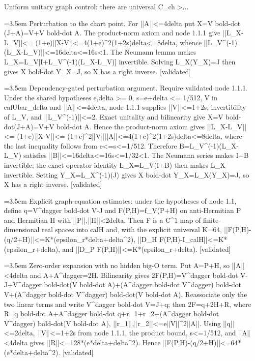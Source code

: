\documentclass{article}
\newcommand{\step}[1]{\par\noindent\hangindent=3.5em\hangafter=1%
  \makebox[3.5em][l]{\textbf{#1.}}}
\newcommand{\steptag}[1]{\hfill{\small\textsf{[#1]}}}
\begin{document}
\begin{proofbox}{Uniform unitary graph control: there are universal C\_ch >...}
\step{1.1.2} Perturbation to the chart point. For ||A||<=4delta put X=V bold-dot (J+A)=V+V bold-dot A. The product-norm axiom and node 1.1.1 give ||L\_X-L\_V||<= (1+e)||X-V||<=4(1+e)\textasciicircum{}2(1+2s)delta<=8delta, whence ||L\_V\textasciicircum{}(-1)(L\_X-L\_V)||<=16delta<=16s<1. The Neumann lemma makes L\_X=L\_V[I+L\_V\textasciicircum{}(-1)(L\_X-L\_V)] invertible. Solving L\_X(Y\_X)=J then gives X bold-dot Y\_X=J, so X has a right inverse. \steptag{validated} \\[6pt]
\step{1.1.2.1} Dependency-gated perturbation argument. Require validated node 1.1.1. Under the shared hypotheses e,delta >= 0, s=e+delta <= 1/512, V in calUbar\_delta and ||A||<=4delta, node 1.1.1 supplies ||V||<=1+2s, invertibility of L\_V, and ||L\_V\textasciicircum{}(-1)||<=2. Exact unitality and bilinearity give X=V bold-dot(J+A)=V+V bold-dot A. Hence the product-norm axiom gives ||L\_X-L\_V||<= (1+e)||X-V||<= (1+e)\textasciicircum{}2||V||||A||<=4(1+e)\textasciicircum{}2(1+2s)delta<=8delta, where the last inequality follows from e<=s<=1/512. Therefore B=L\_V\textasciicircum{}(-1)(L\_X-L\_V) satisfies ||B||<=16delta<=16s<=1/32<1. The Neumann series makes I+B invertible; the exact operator identity L\_X=L\_V(I+B) then makes L\_X invertible. Setting Y\_X=L\_X\textasciicircum{}(-1)(J) gives X bold-dot Y\_X=L\_X(Y\_X)=J, so X has a right inverse. \steptag{validated} \\[4pt]
\step{1.2} Explicit graph-equation estimates: under the hypotheses of node 1.1, define q=V\textasciicircum{}dagger bold-dot V-J and F(P,H)=f\_V(P+H) on anti-Hermitian P and Hermitian H with ||P||,||H||<2delta. Then F is a C\textasciicircum{}1 map of finite-dimensional real spaces into calH and, with the explicit universal K=64, ||F(P,H)-(q/2+H)||<=K*(epsilon\_r*delta+delta\textasciicircum{}2), ||D\_H F(P,H)-I\_calH||<=K*(epsilon\_r+delta), and ||D\_P F(P,H)||<=K*(epsilon\_r+delta). \steptag{validated} \\[6pt]
\step{1.2.1} Zero-order expansion with no hidden big-O term. Put A=P+H, so ||A||<4delta and A+A\textasciicircum{}dagger=2H. Bilinearity gives 2F(P,H)=V\textasciicircum{}dagger bold-dot V-J+V\textasciicircum{}dagger bold-dot(V bold-dot A)+(A\textasciicircum{}dagger bold-dot V\textasciicircum{}dagger) bold-dot V+(A\textasciicircum{}dagger bold-dot V\textasciicircum{}dagger) bold-dot(V bold-dot A). Reassociate only the two linear terms and write V\textasciicircum{}dagger bold-dot V=J+q; then 2F=q+2H+R, where R=q bold-dot A+A\textasciicircum{}dagger bold-dot q+r\_1+r\_2+(A\textasciicircum{}dagger bold-dot V\textasciicircum{}dagger) bold-dot(V bold-dot A), ||r\_1||,||r\_2||<=e||V||\textasciicircum{}2||A||. Using ||q||<=2delta, ||V||<=1+2s from node 1.1.1, the product bound, s<=1/512, and ||A||<4delta gives ||R||<=128*(e*delta+delta\textasciicircum{}2). Hence ||F(P,H)-(q/2+H)||<=64*(e*delta+delta\textasciicircum{}2). \steptag{validated} \\[4pt]

\end{proofbox}
\end{document}
